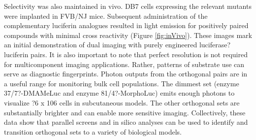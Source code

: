 Selectivity was also maintained in vivo. DB7 cells expressing the relevant mutants were implanted in FVB/NJ mice. Subsequent administration of the complementary luciferin analogues resulted in light emission for positively paired compounds with minimal cross reactivity (Figure \ref{fig:inVivo}). These images mark an initial demonstration of dual imaging with purely engineered luciferase?luciferin pairs. It is also important to note that perfect resolution is not required for multicomponent imaging applications. Rather, patterns of substrate use can serve as diagnostic fingerprints.\cite{Peacor:2017kh} Photon outputs from the orthogonal pairs are in a useful range for monitoring bulk cell populations. The dimmest set (enzyme 37/7?-DMAMeLuc and enzyme 81/4?-MorphoLuc) emits enough photons to visualize ?6 x 106 cells in subcutaneous models. The other orthogonal sets are substantially brighter and can enable more sensitive imaging. Collectively, these data show that parallel screens and in silico analyses can be used to identify and transition orthogonal sets to a variety of biological models.

